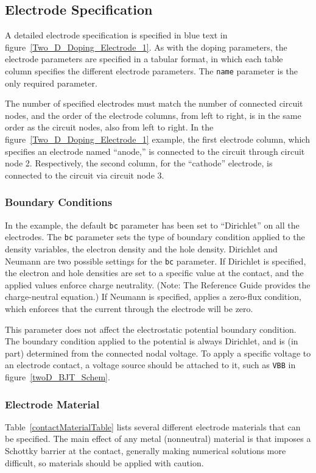 \subsection{Electrode Specification}
A detailed electrode specification is specified in blue text
in figure~\ref{Two_D_Doping_Electrode_1}.  As with the doping parameters, 
the electrode parameters are specified in a tabular format, in which each table 
column specifies the different electrode parameters.  The \texttt{name} parameter 
is the only required parameter.

The number of specified electrodes must match the number of connected 
circuit nodes, and the order of the electrode columns, from left to right,
is in the same order as the circuit nodes, also from left to right.  In 
the figure~\ref{Two_D_Doping_Electrode_1} example, the first electrode column,
which specifies an electrode named ``anode,'' is connected to the circuit 
through circuit node 2.  Respectively, the second column, for the ``cathode'' 
electrode, is connected to the circuit via circuit node 3.

\subsubsection{Boundary Conditions}
In the example, the default \texttt{bc} parameter has been set to ``Dirichlet''
on all the electrodes. The \texttt{bc} parameter sets the type of boundary 
condition applied to the density variables, the electron density and the hole density.
Dirichlet and Neumann are two possible settings for the \texttt{bc} parameter.  
If Dirichlet is specified, the electron and hole densities are set to a specific 
value at the contact, and the applied values enforce charge neutrality.  
(Note: The \Xyce{} Reference Guide\ReferenceGuide{} provides the charge-neutral 
equation.)  If Neumann is specified, \Xyce{} applies a zero-flux condition, 
which enforces that the current through the electrode will be zero.

This parameter does not affect the electrostatic potential boundary condition.
The boundary condition applied to the potential is always Dirichlet, and is
(in part) determined from the connected nodal voltage.  To apply a specific
voltage to an electrode contact, a voltage source should be attached to it,
such as \texttt{VBB} in figure~\ref{twoD_BJT_Schem}.

\subsubsection{Electrode Material}
Table~\ref{contactMaterialTable} lists several different electrode materials that can be specified.   
The main effect of any metal (nonneutral) material is that \Xyce{} imposes a
Schottky barrier at the contact, generally making numerical solutions
more difficult, so materials should be applied with caution.

